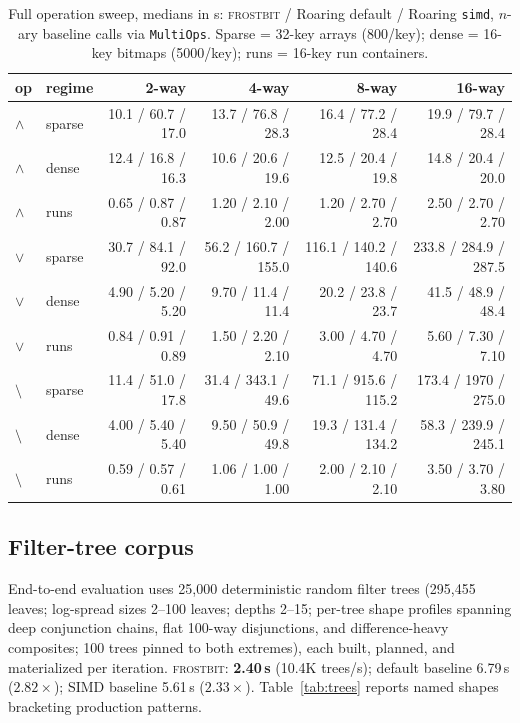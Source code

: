 \documentclass[sigconf,nonacm]{acmart}
\newcommand{\fb}{\textsc{frostbit}}
\begin{document}
\begin{table}[t]
\caption{Full operation sweep, medians in \textmu s: \fb{} / Roaring
default / Roaring \texttt{simd}, $n$-ary baseline calls via
\texttt{MultiOps}. Sparse = 32-key arrays (800/key); dense = 16-key
bitmaps (5000/key); runs = 16-key run containers.}
\label{tab:sweep}
\small
\begin{tabular}{llrrrr}
\toprule
op & regime & 2-way & 4-way & 8-way & 16-way \\
\midrule
$\wedge$ & sparse & 10.1 / 60.7 / 17.0 & 13.7 / 76.8 / 28.3 & 16.4 / 77.2 / 28.4 & 19.9 / 79.7 / 28.4 \\
$\wedge$ & dense & 12.4 / 16.8 / 16.3 & 10.6 / 20.6 / 19.6 & 12.5 / 20.4 / 19.8 & 14.8 / 20.4 / 20.0 \\
$\wedge$ & runs & 0.65 / 0.87 / 0.87 & 1.20 / 2.10 / 2.00 & 1.20 / 2.70 / 2.70 & 2.50 / 2.70 / 2.70 \\
$\vee$ & sparse & 30.7 / 84.1 / 92.0 & 56.2 / 160.7 / 155.0 & 116.1 / 140.2 / 140.6 & 233.8 / 284.9 / 287.5 \\
$\vee$ & dense & 4.90 / 5.20 / 5.20 & 9.70 / 11.4 / 11.4 & 20.2 / 23.8 / 23.7 & 41.5 / 48.9 / 48.4 \\
$\vee$ & runs & 0.84 / 0.91 / 0.89 & 1.50 / 2.20 / 2.10 & 3.00 / 4.70 / 4.70 & 5.60 / 7.30 / 7.10 \\
$\setminus$ & sparse & 11.4 / 51.0 / 17.8 & 31.4 / 343.1 / 49.6 & 71.1 / 915.6 / 115.2 & 173.4 / 1970 / 275.0 \\
$\setminus$ & dense & 4.00 / 5.40 / 5.40 & 9.50 / 50.9 / 49.8 & 19.3 / 131.4 / 134.2 & 58.3 / 239.9 / 245.1 \\
$\setminus$ & runs & 0.59 / 0.57 / 0.61 & 1.06 / 1.00 / 1.00 & 2.00 / 2.10 / 2.10 & 3.50 / 3.70 / 3.80 \\
\bottomrule
\end{tabular}
\end{table}

\subsection{Filter-tree corpus}

End-to-end evaluation uses 25{,}000 deterministic random filter trees
(295{,}455 leaves; log-spread sizes 2--100 leaves; depths 2--15;
per-tree shape profiles spanning deep conjunction chains, flat 100-way
disjunctions, and difference-heavy composites; 100 trees pinned to both
extremes), each built, planned, and materialized per iteration.
\fb: \textbf{2.40\,s} (10.4K trees/s); default baseline 6.79\,s
($2.82\times$); SIMD baseline 5.61\,s ($2.33\times$).
Table~\ref{tab:trees} reports named shapes bracketing production
patterns.
\end{document}
